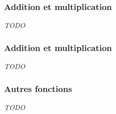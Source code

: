 \documentclass{beamer}
\begin{document}

\begin{frame}
\frametitle{Addition et multiplication}
\begin{center}
\emph{TODO}
\end{center}
\end{frame}


\begin{frame}
\frametitle{Addition et multiplication}
\begin{center}
\emph{TODO}
\end{center}
\end{frame}


\begin{frame}
\frametitle{Autres fonctions}
\begin{center}
\emph{TODO}
\end{center}
\end{frame}
\end{document}
